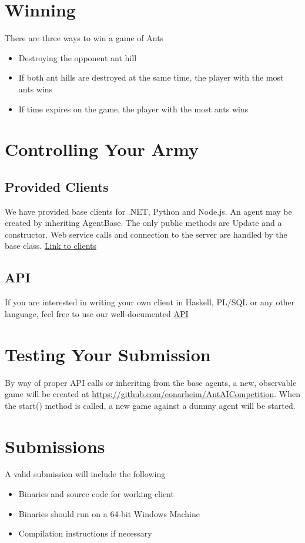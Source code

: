 \documentclass{article}
\begin{document}
\newpage
\section{Winning}
There are three ways to win a game of Ants
\begin{itemize}
  \item Destroying the opponent ant hill
  \item If both ant hills are destroyed at the same time, the player with the most ants wins
  \item If time expires on the game, the player with the most ants wins
\end{itemize}

\section{Controlling Your Army}
\subsection{Provided Clients}
We have provided base clients for .NET, Python and Node.js. An agent may be created by inheriting AgentBase. The only public methods are Update and a constructor. Web service calls and connection to the server are handled by the base class.
\newline
\newline
\href{https://github.com/eonarheim/AntAICompetition}{Link to clients}

\subsection{API}
If you are interested in writing your own client in Haskell, PL/SQL or any other language, feel free to use our well-documented \href{https://github.com/eonarheim/AntAICompetition}{API}

\section{Testing Your Submission}

By way of proper API calls or inheriting from the base agents, a new, observable game will be created at \url{https://github.com/eonarheim/AntAICompetition}.
\newline
\newline
When the start() method is called, a new game against a dummy agent will be started. 

\section{Submissions}
A valid submission will include the following
\begin{itemize}
  \item Binaries and source code for working client
  \item Binaries should run on a 64-bit Windows Machine
  \item Compilation instructions if necessary
\end{itemize}
\end{document}
